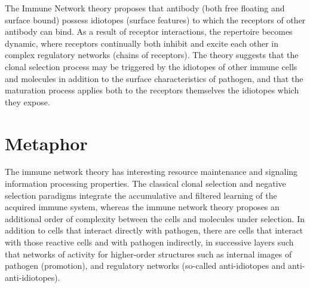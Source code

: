 \documentclass[a4paper, 11pt]{article}
\begin{document}
The Immune Network theory proposes that antibody (both free floating and surface bound) possess idiotopes (surface features) to which the receptors of other antibody can bind. As a result of receptor interactions, the repertoire becomes dynamic, where receptors continually both inhibit and excite each other in complex regulatory networks (chains of receptors). The theory suggests that the clonal selection process may be triggered by the idiotopes of other immune cells and molecules in addition to the surface characteristics of pathogen, and that the maturation process applies both to the receptors themselves the idiotopes which they expose. 

\section{Metaphor}
\label{sec:metaphor}
The immune network theory has interesting resource maintenance and signaling information processing properties.
The classical clonal selection and negative selection paradigms integrate the accumulative and filtered learning of the acquired immune system, whereas the immune network theory proposes an additional order of complexity between the cells and molecules under selection. In addition to cells that interact directly with pathogen, there are cells that interact with those reactive cells and with pathogen indirectly, in successive layers such that networks of activity for higher-order structures such as internal images of pathogen (promotion), and regulatory networks (so-called anti-idiotopes and anti-anti-idiotopes).

\end{document}
